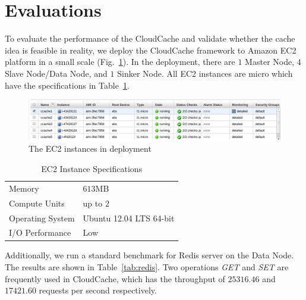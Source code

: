 \section{Evaluations} \label{sec:evaluation}
To evaluate the performance of the CloudCache and validate whether the cache idea is feasible in reality, we deploy the CloudCache framework to Amazon EC2 platform in a small scale (Fig.~\ref{fig:ec2}). In the deployment, there are $1$ Master Node, $4$ Slave Node/Data Node, and $1$ Sinker Node. All EC2 instances are micro which have the specifications in Table~\ref{tab:ec2}.

\begin{figure}
\centering
\includegraphics[width=\textwidth]{pics/deployment.png}
\caption{The EC2 instances in deployment}
\label{fig:ec2}
\end{figure}

\begin{table}
\centering
\caption{EC2 Instance Specifications}
\begin{tabular}{ll}\toprule
Memory & $613$MB \\
Compute Units & up to $2$ \\
Operating System & Ubuntu 12.04 LTS 64-bit \\
I/O Performance & Low \\\bottomrule
\end{tabular}
\label{tab:ec2}
\end{table}

Additionally, we run a standard benchmark for Redis server on the Data Node. The results are shown in Table~\ref{tab:redis}. Two operations \emph{GET} and \emph{SET} are frequently used in CloudCache, which has the throughput of $25316.46$ and $17421.60$ requests per second respectively.

